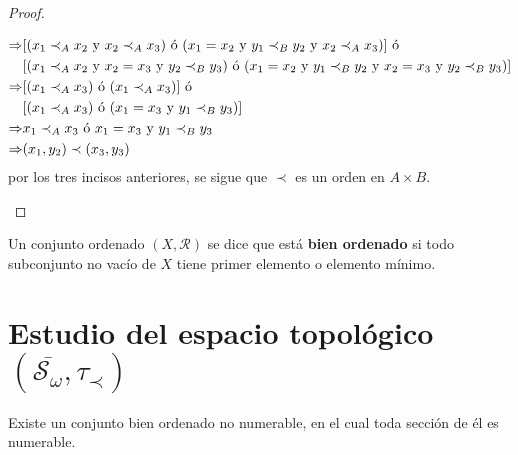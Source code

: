 \documentclass[12pt]{report}
\theoremstyle{largebreak}
\newcommand{\Cls}[1]{\ensuremath{\overline{#1}}}
\begin{document}
\begin{proof}
\begin{enumerate}
\begin{equation*}
\begin{split}
                    \Rightarrow &[(x_1\prec_A x_2\textup{ y }x_2\prec_A x_3)\textup{ ó }(x_1=x_2 \textup{ y } y_1\prec_B y_2\textup{ y }x_2\prec_A x_3)]\textup{ ó }\\
                    &[(x_1\prec_A x_2\textup{ y }x_2=x_3 \textup{ y } y_2\prec_B y_3)\textup{ ó }(x_1=x_2 \textup{ y } y_1\prec_B y_2\textup{ y }x_2=x_3 \textup{ y } y_2\prec_B y_3)]\\
                    \Rightarrow &[(x_1\prec_A x_3)\textup{ ó }(x_1\prec_A x_3)]\textup{ ó }\\
                    &[(x_1\prec_A x_3)\textup{ ó }(x_1=x_3 \textup{ y } y_1\prec_B y_3)]\\
                    \Rightarrow &x_1\prec_A x_3\textup{ ó }x_1=x_3 \textup{ y } y_1\prec_B y_3\\
                    \Rightarrow &(x_1,y_2)\prec (x_3,y_3)\\
                \end{split}
            \end{equation*}
            por los tres incisos anteriores, se sigue que $\prec$ es un orden en $A\times B$.
        \end{enumerate}
    \end{proof}

    \begin{mydef}
        Un conjunto ordenado $(X,\mathcal{R})$ se dice que está \textbf{bien ordenado} si todo subconjunto no vacío de $X$ tiene primer elemento o elemento mínimo.
    \end{mydef}

    \section{Estudio del espacio topológico $(\Cls{\mathcal{S}_\omega},\tau_\prec)$}

    \begin{propo}
        Existe un conjunto bien ordenado no numerable, en el cual toda sección de él es numerable.
    \end{propo}
\end{document}
